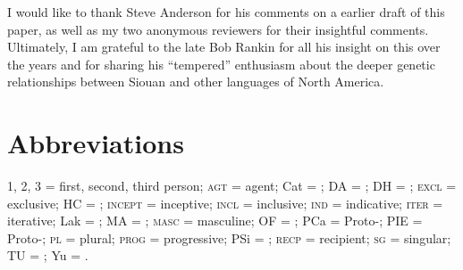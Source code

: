 \documentclass[output=paper]{LSP/langsci}
\begin{document}
I would like to thank Steve Anderson for his comments on a earlier draft of this paper, as well as my two anonymous reviewers for their insightful comments. Ultimately, I am grateful to the late Bob Rankin for all his insight on this  over the years and for sharing his ``tempered'' enthusiasm about the deeper genetic relationships between Siouan and other languages of North America.

\section*{Abbreviations}
1, 2, 3 = first, second, third person; \textsc{agt} = agent; Cat = ; DA = ; DH = ; \textsc{excl} = exclusive; HC = ; \textsc{incept} = inceptive; \textsc{incl} = inclusive; \textsc{ind} = indicative; \textsc{iter} = iterative; Lak = ; MA = ; \textsc{masc} = masculine; OF = ; PCa = Proto-; PIE = Proto-; \textsc{pl} = plural; \textsc{prog} = progressive; PSi = ; \textsc{recp} = recipient; \textsc{sg} = singular; TU = ; Yu = .

\nocite{CrawfordNotebooks,Crawford1979}

\printbibliography[heading=subbibliography,notkeyword=this]
 
\end{document}
